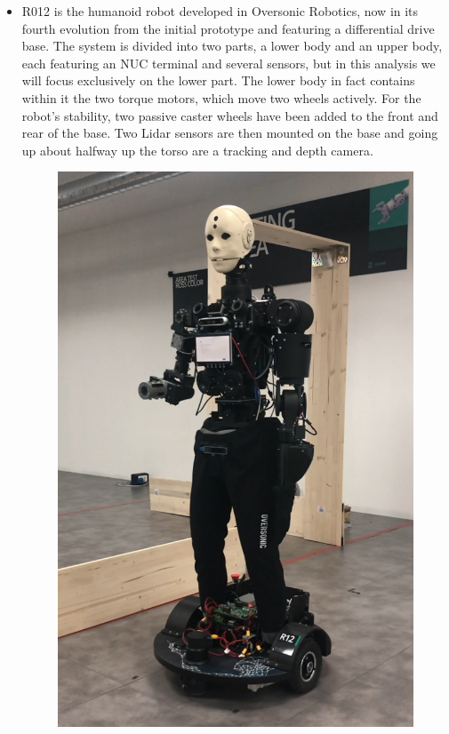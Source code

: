 \begin{itemize}
\begin{figure}[H]
        \label{fig:r007}
    \end{figure}
    \item R012 is the humanoid robot developed in Oversonic Robotics, now in its fourth evolution from the initial prototype and featuring a differential drive base. The system is divided into two parts, a lower body and an upper body, each featuring an NUC terminal and several sensors, but in this analysis we will focus exclusively on the lower part. 
    The lower body in fact contains within it the two torque motors, which move two wheels actively. For the robot's stability, two passive caster wheels have been added to the front and rear of the base. Two Lidar sensors are then mounted on the base and going up about halfway up the torso are a tracking and depth camera. 
    \begin{figure}[H]
        \centering
        \includegraphics[scale=0.15]{Images/Chapter 3/r012.PNG}

\end{figure}
\end{itemize}
